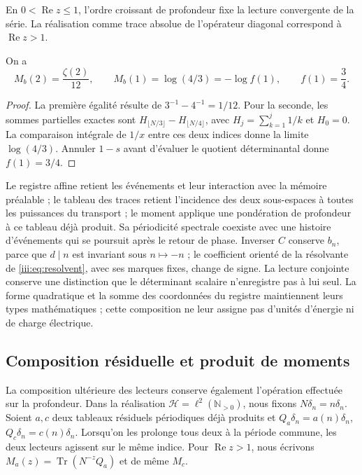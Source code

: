 En $0<\operatorname{Re}z\leq1$, l’ordre croissant de profondeur
fixe la lecture convergente de la série. La réalisation comme trace
absolue de l’opérateur diagonal correspond à $\operatorname{Re}z>1$.

\begin{corollary}
\label{amp-afin-cor-extremos}
On a
\begin{equation}
 M_b(2)=\frac{\zeta(2)}{12},\qquad
 M_b(1)=\log(4/3)=-\log f(1),\qquad f(1)=\frac34.
 \label{amp-afin-extremos}
\end{equation}
\end{corollary}
\begin{proof}
La première égalité résulte de $3^{-1}-4^{-1}=1/12$.
Pour la seconde, les sommes partielles exactes sont
$H_{\lfloor N/3\rfloor}-H_{\lfloor N/4\rfloor}$, avec
$H_j=\sum_{k=1}^j1/k$ et $H_0=0$.
La comparaison intégrale de $1/x$ entre ces deux indices donne la limite
$\log(4/3)$. Annuler $1-s$ avant d’évaluer le quotient déterminantal
donne $f(1)=3/4$.
\end{proof}

Le registre affine retient les événements et leur interaction avec la mémoire
préalable ; le tableau des traces retient l’incidence des deux sous-espaces
à toutes les puissances du transport ; le moment applique une pondération
de profondeur à ce tableau déjà produit. Sa périodicité spectrale
coexiste avec une histoire d’événements qui se poursuit après le retour
de phase. Inverser $C$ conserve $b_n$, parce que $d\mid n$ est invariant
sous $n\mapsto-n$ ; le coefficient orienté de la résolvante de
\eqref{iii:eq:resolvent}, avec ses marques fixes, change de signe.
La lecture conjointe conserve une distinction que le déterminant
scalaire n’enregistre pas à lui seul. La forme quadratique et la somme des
coordonnées du registre maintiennent leurs types mathématiques ; cette
composition ne leur assigne pas d’unités d’énergie ni de charge électrique.

\subsection{Composition résiduelle et produit de moments}
\label{amp-afin-sec-productos}

La composition ultérieure des lecteurs conserve également l’opération
effectuée sur la profondeur. Dans la réalisation
$\mathcal H=\ell^2(\mathbb N_{>0})$, nous fixons
$N\delta_n=n\delta_n$. Soient $a,c$ deux tableaux résiduels périodiques
déjà produits et $Q_a\delta_n=a(n)\delta_n$,
$Q_c\delta_n=c(n)\delta_n$. Lorsqu’on les prolonge tous deux à la période commune,
les deux lecteurs agissent sur le même indice. Pour
$\operatorname{Re}z>1$, nous écrivons
$M_a(z)=\operatorname{Tr}(N^{-z}Q_a)$ et de même $M_c$.


